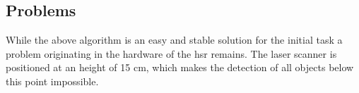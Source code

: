 \documentclass[main.tex]{subfiles}
\begin{document}
		\subsection{Problems} 
		While the above algorithm is an easy and stable solution for the initial task a problem originating in the hardware of the hsr remains. The laser scanner is positioned at an height of 15 cm, which makes the detection of all objects below this point impossible.
	
	
\end{document}
